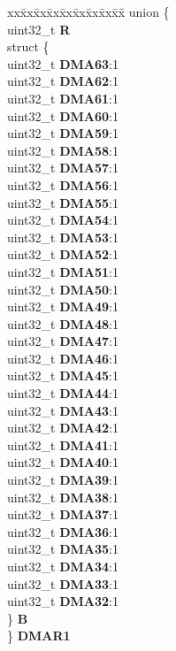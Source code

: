 \begin{DoxyCompactItemize}
\begin{tabbing}
\end{tabbing}\item 
\mbox{\label{structADC__tag_aacbe668b406d34080e120ebb6ef56bc0}} 
\begin{tabbing}
xx\=xx\=xx\=xx\=xx\=xx\=xx\=xx\=xx\=\kill
union \{\\
\>uint32\_t {\bfseries R}\\
\>struct \{\\
\>\>uint32\_t {\bfseries DMA63}:1\\
\>\>uint32\_t {\bfseries DMA62}:1\\
\>\>uint32\_t {\bfseries DMA61}:1\\
\>\>uint32\_t {\bfseries DMA60}:1\\
\>\>uint32\_t {\bfseries DMA59}:1\\
\>\>uint32\_t {\bfseries DMA58}:1\\
\>\>uint32\_t {\bfseries DMA57}:1\\
\>\>uint32\_t {\bfseries DMA56}:1\\
\>\>uint32\_t {\bfseries DMA55}:1\\
\>\>uint32\_t {\bfseries DMA54}:1\\
\>\>uint32\_t {\bfseries DMA53}:1\\
\>\>uint32\_t {\bfseries DMA52}:1\\
\>\>uint32\_t {\bfseries DMA51}:1\\
\>\>uint32\_t {\bfseries DMA50}:1\\
\>\>uint32\_t {\bfseries DMA49}:1\\
\>\>uint32\_t {\bfseries DMA48}:1\\
\>\>uint32\_t {\bfseries DMA47}:1\\
\>\>uint32\_t {\bfseries DMA46}:1\\
\>\>uint32\_t {\bfseries DMA45}:1\\
\>\>uint32\_t {\bfseries DMA44}:1\\
\>\>uint32\_t {\bfseries DMA43}:1\\
\>\>uint32\_t {\bfseries DMA42}:1\\
\>\>uint32\_t {\bfseries DMA41}:1\\
\>\>uint32\_t {\bfseries DMA40}:1\\
\>\>uint32\_t {\bfseries DMA39}:1\\
\>\>uint32\_t {\bfseries DMA38}:1\\
\>\>uint32\_t {\bfseries DMA37}:1\\
\>\>uint32\_t {\bfseries DMA36}:1\\
\>\>uint32\_t {\bfseries DMA35}:1\\
\>\>uint32\_t {\bfseries DMA34}:1\\
\>\>uint32\_t {\bfseries DMA33}:1\\
\>\>uint32\_t {\bfseries DMA32}:1\\
\>\} {\bfseries B}\\
\} {\bfseries DMAR1}\\


\end{tabbing}
\end{DoxyCompactItemize}
